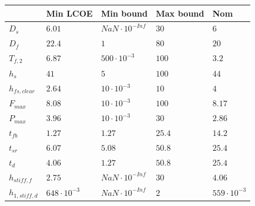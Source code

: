 \begin{tabular}{lllll}
& Min LCOE & Min bound & Max bound & Nom\\ 
\hline 
$D_s$ & $6.01 $ & $NaN \cdot 10^{-Inf}$ & $30 $ & $6 $ \\ 
$D_f$ & $22.4 $ & $1 $ & $80 $ & $20 $ \\ 
$T_{f,2}$ & $6.87 $ & $500 \cdot 10^{-3}$ & $100 $ & $3.2 $ \\ 
$h_s$ & $41 $ & $5 $ & $100 $ & $44 $ \\ 
$h_{fs,clear}$ & $2.64 $ & $10 \cdot 10^{-3}$ & $10 $ & $4 $ \\ 
$F_{max}$ & $8.08 $ & $10 \cdot 10^{-3}$ & $100 $ & $8.17 $ \\ 
$P_{max}$ & $3.96 $ & $10 \cdot 10^{-3}$ & $30 $ & $2.86 $ \\ 
$t_{fb}$ & $1.27 $ & $1.27 $ & $25.4 $ & $14.2 $ \\ 
$t_{sr}$ & $6.07 $ & $5.08 $ & $50.8 $ & $25.4 $ \\ 
$t_d$ & $4.06 $ & $1.27 $ & $50.8 $ & $25.4 $ \\ 
$h_{stiff,f}$ & $2.75 $ & $NaN \cdot 10^{-Inf}$ & $30 $ & $4.06 $ \\ 
$h_{1,stiff,d}$ & $648 \cdot 10^{-3}$ & $NaN \cdot 10^{-Inf}$ & $2 $ & $559 \cdot 10^{-3}$ \\ 
\end{tabular}